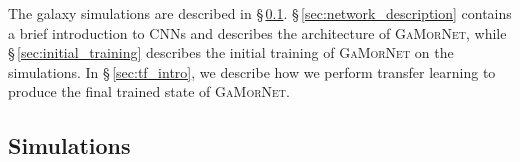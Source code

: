 \documentclass[twocolumn]{aastex63}
\newcommand\gamornet{G\textsc{a}M\textsc{or}N\textsc{et}}
\begin{document}
The galaxy simulations are described in \S\,\ref{sec:simulation_code}. \S\,\ref{sec:network_description} contains a brief introduction to CNNs and describes the architecture of \gamornet{}, while \S\,\ref{sec:initial_training} describes the initial training of \gamornet{} on the simulations. In \S\,\ref{sec:tf_intro}, we describe how we perform transfer learning to produce the final trained state of \gamornet{}.

\subsection{Simulations} \label{sec:simulation_code}

\begin{figure}[hbt]
	\begin{center}

\end{center}
\end{figure}
\end{document}
